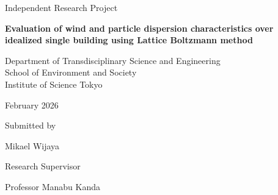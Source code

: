 \documentclass[12pt]{article}
\begin{document}
\onehalfspacing{}

\begin{titlepage}
    \centering
    \vspace*{1cm}

    {\fontsize{16}{20}\selectfont Independent Research Project\par}
    
    \vspace{1.5cm}

    {\fontsize{18}{22}\selectfont \textbf{Evaluation of wind and particle dispersion characteristics over idealized single building using Lattice Boltzmann method}\par}

    \vspace{2cm}

    {\fontsize{12}{15}\selectfont 
        Department of Transdisciplinary Science and Engineering \\
        School of Environment and Society \\
        Institute of Science Tokyo \par}

    \vfill

    {\fontsize{14}{18}\selectfont
        February 2026 \par
        \vspace{1cm}
        Submitted by \par
        \vspace{0.5cm}
        Mikael Wijaya \par
        
        \vspace{2cm}
        
        Research Supervisor \par
        \vspace{0.5cm}
        Professor Manabu Kanda \par}

    \vspace{1cm}
\end{titlepage}





\newpage
\tableofcontents
\newpage
\listoffigures
\newpage
\listoftables
\newpage

\newpage







\printbibliography
\end{document}

